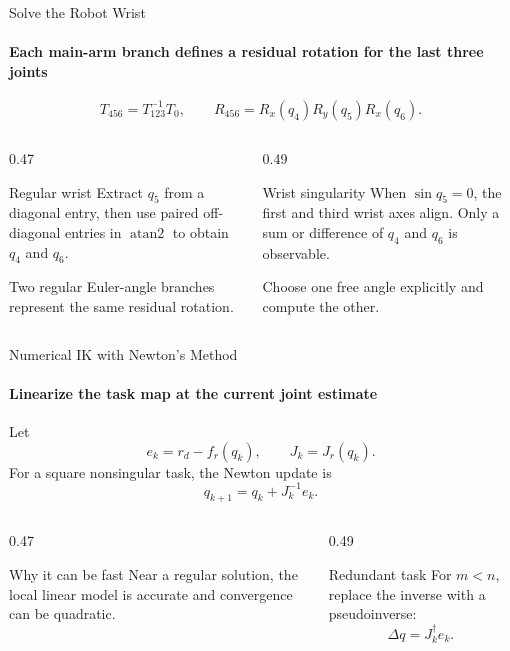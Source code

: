 \documentclass[aspectratio=169]{beamer}
\begin{document}
\begin{frame}[t]{Solve the Robot Wrist}
    \framesubtitle{Each main-arm branch defines a residual rotation for the last three joints}
    \[
        T_{456}=T_{123}^{-1}T_0,
        \qquad
        R_{456}=R_x(q_4)R_y(q_5)R_x(q_6).
    \]
    \begin{columns}[T,onlytextwidth]
        \begin{column}{0.47\textwidth}
            \begin{block}{Regular wrist}
                Extract $q_5$ from a diagonal entry, then use paired off-diagonal entries in $\operatorname{atan2}$ to obtain $q_4$ and $q_6$.

                \medskip
                Two regular Euler-angle branches represent the same residual rotation.
            \end{block}
        \end{column}
        \begin{column}{0.49\textwidth}
            \begin{block}{Wrist singularity}
                When $\sin q_5=0$, the first and third wrist axes align. Only a sum or difference of $q_4$ and $q_6$ is observable.

                \medskip
                Choose one free angle explicitly and compute the other.
            \end{block}
        \end{column}
    \end{columns}
\end{frame}

\begin{frame}[t]{Numerical IK with Newton's Method}
    \framesubtitle{Linearize the task map at the current joint estimate}
    Let
    \[
        e_k=r_d-f_r(q_k),
        \qquad
        J_k=J_r(q_k).
    \]
    For a square nonsingular task, the Newton update is
    \[
        q_{k+1}=q_k+J_k^{-1}e_k.
    \]
    \begin{columns}[T,onlytextwidth]
        \begin{column}{0.47\textwidth}
            \begin{block}{Why it can be fast}
                Near a regular solution, the local linear model is accurate and convergence can be quadratic.
            \end{block}
        \end{column}
        \begin{column}{0.49\textwidth}
            \begin{block}{Redundant task}
                For $m<n$, replace the inverse with a pseudoinverse:
                \[
                    \Delta q=J_k^{\dagger}e_k.
                \]
            \end{block}
        \end{column}
    \end{columns}
\end{frame}
\end{document}
